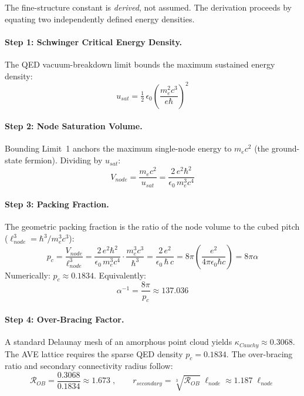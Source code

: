 The fine-structure constant is \textit{derived}, not assumed. The derivation
proceeds by equating two independently defined energy densities.

\paragraph{Step 1: Schwinger Critical Energy Density.}
The QED vacuum-breakdown limit bounds the maximum sustained energy density:
\begin{equation}
    u_{sat}
    = \tfrac{1}{2}\,\epsilon_0 \!\left(\frac{m_e^2 c^3}{e\hbar}\right)^{\!2}
    \label{eq:usat}
\end{equation}

\paragraph{Step 2: Node Saturation Volume.}
Bounding Limit~1 anchors the maximum single-node energy to $m_e c^2$
(the ground-state fermion). Dividing by $u_{sat}$:
\begin{equation}
    V_{node}
    = \frac{m_e c^2}{u_{sat}}
    = \frac{2\,e^2 \hbar^2}{\epsilon_0\,m_e^3 c^4}
    \label{eq:Vnode}
\end{equation}

\paragraph{Step 3: Packing Fraction.}
The geometric packing fraction is the ratio of the node volume to the
cubed pitch ($\ell_{node}^3 = \hbar^3 / m_e^3 c^3$):
\begin{equation}
    p_c
    = \frac{V_{node}}{\ell_{node}^3}
    = \frac{2\,e^2 \hbar^2}{\epsilon_0\,m_e^3 c^4}
      \cdot \frac{m_e^3 c^3}{\hbar^3}
    = \frac{2\,e^2}{\epsilon_0\,\hbar\,c}
    = 8\pi\!\left(\frac{e^2}{4\pi\epsilon_0 \hbar c}\right)
    = \boxed{8\pi\alpha}
    \label{eq:pc}
\end{equation}
Numerically: $p_c \approx 0.1834$. Equivalently:
\begin{equation}
    \alpha^{-1} = \frac{8\pi}{p_c} \approx 137.036
    \label{eq:alpha_inverse}
\end{equation}

\paragraph{Step 4: Over-Bracing Factor.}
A standard Delaunay mesh of an amorphous point cloud yields
$\kappa_{Cauchy} \approx 0.3068$. The AVE lattice requires the sparse
QED density $p_c = 0.1834$. The over-bracing ratio and secondary connectivity
radius follow:
\begin{equation}
    \mathcal{R}_{OB}
    = \frac{0.3068}{0.1834} \approx 1.673
    \;,\qquad
    r_{secondary}
    = \sqrt[3]{\mathcal{R}_{OB}}\;\ell_{node}
    \approx 1.187\;\ell_{node}
    \label{eq:overbracing}
\end{equation}

